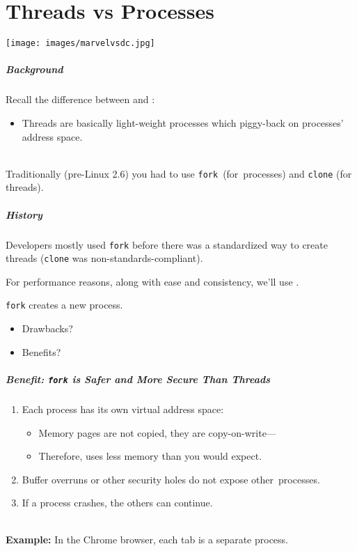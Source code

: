 \part{Threads vs Processes}
\begin{frame}
\partpage
\begin{center}
	\texttt{[image: images/marvelvsdc.jpg]}
\end{center}
\end{frame}


\begin{frame}[fragile]
  \frametitle{Background}


  Recall the difference between  and 
          :
  \begin{itemize}
    \item Threads are basically light-weight processes which piggy-back on
          processes' address space.
  \end{itemize} ~\\
  Traditionally (pre-Linux 2.6) you had to use {\tt fork}~(for~processes) and {\tt clone} (for threads).


\end{frame}

\begin{frame}[fragile]
  \frametitle{History}


    Developers mostly used {\tt fork} before there was a standardized way to create threads ({\tt clone} was non-standards-compliant).

  For performance reasons, along with ease and consistency, we'll use
  .

  {\tt fork} creates a new process.
      \begin{itemize}
        \item Drawbacks?
        \item Benefits?
      \end{itemize}
  
\end{frame}

\begin{frame}[fragile]
  \frametitle{Benefit: {\tt fork} is Safer and More Secure Than Threads}

  \begin{enumerate}
    \item Each process has its own virtual address space:
      \begin{itemize}
        \item Memory pages are not copied, they are copy-on-write---
        \item Therefore, uses less memory than you would expect.
      \end{itemize}
    \item Buffer overruns or other security holes do not expose other~processes.
    \item If a process crashes, the others can continue.
  \end{enumerate}~\\[1em]
  {\bf Example:} In the Chrome browser, each tab is a separate process.
\end{frame}

